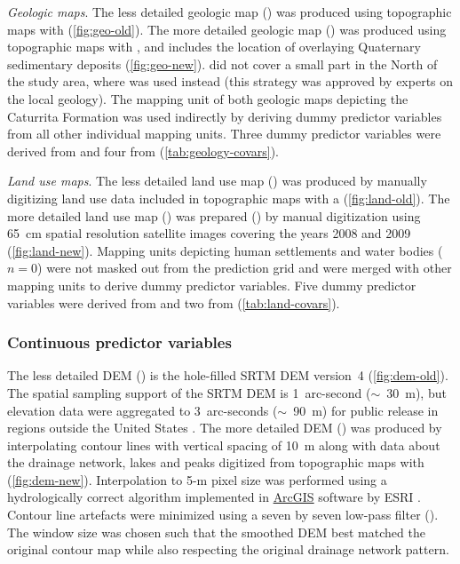 \noindent\textit{Geologic maps}. The less detailed geologic map (\geoOld) was produced 
using topographic maps with  \citep{GasparettoEtAl1988} 
(\autoref{fig:geo-old}). The more detailed geologic map (\geoNew) was produced 
using topographic maps with , and includes the location of 
overlaying Quaternary sedimentary deposits \citep{MacielFilho1990} 
(\autoref{fig:geo-new}). \geoNew{} did not cover a small part in the North of 
the study area, where \geoOld{} was used instead (this strategy was approved by
experts on the local geology). The mapping unit of both geologic maps depicting
the Caturrita Formation was used indirectly by deriving dummy predictor 
variables from all other individual mapping units. Three dummy predictor 
variables were derived from \geoOld{} and four from \geoNew{} 
(\autoref{tab:geology-covars}).

\noindent\textit{Land use maps}. The less detailed land use map (\landOld) was 
produced by manually digitizing land use data included in topographic maps with a 
 \citep{DSG1980, DSG1992, DSG1992a} (\autoref{fig:land-old}). 
The more detailed land use map (\landNew) was prepared () by 
manual digitization using 65~cm spatial resolution satellite images covering 
the years 2008 and 2009 \citep{SamuelRosaEtAl2011a} (\autoref{fig:land-new}). 
Mapping units depicting human settlements and water bodies ($n=0$) were not 
masked out from the prediction grid and were merged with other mapping units to
derive dummy predictor variables. Five dummy predictor variables were derived 
from \landNew{} and two from \landOld{} (\autoref{tab:land-covars}).

\subsubsection*{Continuous predictor variables}
\label{subsubsec:continuous-covars}

The less detailed DEM (\demOld) is the hole-filled SRTM DEM version~4 
\citep{JarvisEtAl2008} (\autoref{fig:dem-old}). The spatial sampling support of 
the SRTM DEM is 1~arc-second ($\sim$~30~m), but elevation data were aggregated 
to 3~arc-seconds ($\sim$~90~m) for public release in regions outside the United 
States \citep{ReuterEtAl2007}. The more detailed DEM (\demNew) was produced by 
interpolating contour lines with vertical spacing of 10~m along with data about 
the drainage network, lakes and peaks digitized from topographic maps with 
 (\autoref{fig:dem-new}). Interpolation to 5-m pixel size was 
performed using a hydrologically correct algorithm implemented in \href{http://resources.arcgis.com/en/help/main/10.1/index.html#/How_Topo_to_Raster_works/009z0000007m000000/}{ArcGIS\textregistered{}} software by ESRI \citep{Hutchinson1989}. Contour line 
artefacts were minimized using a seven by seven low-pass filter 
(). The window size was chosen such that the smoothed DEM 
best matched the original contour map while also respecting the original 
drainage network pattern.

